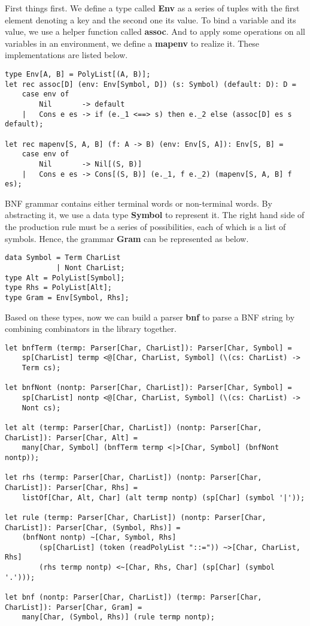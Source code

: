 First things first. We define a type called \textbf{Env} as a series of tuples with the first element denoting a key and the second one its value. To bind a variable and its value, we use a helper function called \textbf{assoc}. And to apply some operations on all variables in an environment, we define a \textbf{mapenv} to realize it. These implementations are listed below.
\begin{lstlisting}
type Env[A, B] = PolyList[(A, B)];
let rec assoc[D] (env: Env[Symbol, D]) (s: Symbol) (default: D): D =
    case env of
        Nil       -> default
    |   Cons e es -> if (e._1 <==> s) then e._2 else (assoc[D] es s default);
    
let rec mapenv[S, A, B] (f: A -> B) (env: Env[S, A]): Env[S, B] =
    case env of
        Nil       -> Nil[(S, B)]
    |   Cons e es -> Cons[(S, B)] (e._1, f e._2) (mapenv[S, A, B] f es);
\end{lstlisting}
BNF grammar contains either terminal words or non-terminal words. By abstracting it, we use a data type \textbf{Symbol} to represent it. The right hand side of the production rule must be a series of possibilities, each of which is a list of symbols. Hence, the grammar \textbf{Gram} can be represented as below.
\begin{lstlisting}
data Symbol = Term CharList
            | Nont CharList;
type Alt = PolyList[Symbol];
type Rhs = PolyList[Alt];
type Gram = Env[Symbol, Rhs];
\end{lstlisting}
Based on these types, now we can build a parser \textbf{bnf} to parse a BNF string by combining combinators in the library together.
\begin{lstlisting}
let bnfTerm (termp: Parser[Char, CharList]): Parser[Char, Symbol] =
    sp[CharList] termp <@[Char, CharList, Symbol] (\(cs: CharList) -> 
    Term cs);
    
let bnfNont (nontp: Parser[Char, CharList]): Parser[Char, Symbol] =
    sp[CharList] nontp <@[Char, CharList, Symbol] (\(cs: CharList) -> 
    Nont cs);
    
let alt (termp: Parser[Char, CharList]) (nontp: Parser[Char, CharList]): Parser[Char, Alt] =
    many[Char, Symbol] (bnfTerm termp <|>[Char, Symbol] (bnfNont nontp));
    
let rhs (termp: Parser[Char, CharList]) (nontp: Parser[Char, CharList]): Parser[Char, Rhs] =
    listOf[Char, Alt, Char] (alt termp nontp) (sp[Char] (symbol '|'));
    
let rule (termp: Parser[Char, CharList]) (nontp: Parser[Char, CharList]): Parser[Char, (Symbol, Rhs)] =
    (bnfNont nontp) ~[Char, Symbol, Rhs]
        (sp[CharList] (token (readPolyList "::=")) ~>[Char, CharList, Rhs] 
        (rhs termp nontp) <~[Char, Rhs, Char] (sp[Char] (symbol '.')));
        
let bnf (nontp: Parser[Char, CharList]) (termp: Parser[Char, CharList]): Parser[Char, Gram] =
    many[Char, (Symbol, Rhs)] (rule termp nontp);
\end{lstlisting}
